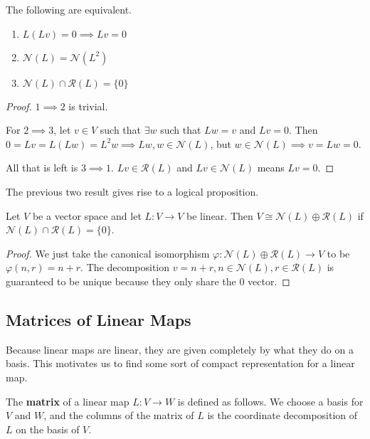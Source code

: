 \begin{prop}
The following are equivalent.
\begin{enumerate}
\item $L(Lv) = 0 \implies Lv = 0$
\item $\mathcal{N}(L) = \mathcal{N}(L^2)$
\item $\mathcal{N}(L) \cap \mathcal{R}(L) = \lbrace 0 \rbrace$
\end{enumerate}
\end{prop}

\begin{proof}
$1 \implies 2$ is trivial.

For $2 \implies 3$, let $v \in V$ such that $\exists w$ such that $Lw =
v$ and $Lv = 0$. Then $0 = Lv = L(Lw) = L^2 w \implies Lw, w \in
\mathcal{N}(L)$, but $w \in \mathcal{N}(L) \implies v = Lw = 0$.

All that is left is $3 \implies 1$. $Lv \in \mathcal{R}(L)$ and $Lv \in
\mathcal{N}(L)$ means $Lv = 0$.
\end{proof}

The previous two result gives rise to a logical proposition.
\begin{prop}
Let $V$ be a vector space and let $L : V \rightarrow V$ be linear. Then
$V \cong \mathcal{N}(L) \oplus \mathcal{R}(L)$ if $\mathcal{N}(L) \cap
\mathcal{R}(L) = \lbrace 0 \rbrace$.
\end{prop}

\begin{proof}
We just take the canonical isomorphism $\varphi : \mathcal{N}(L) \oplus
\mathcal{R}(L) \rightarrow V $ to be $\varphi(n, r) = n + r$. The
decomposition $v = n + r, n \in \mathcal{N}(L), r \in \mathcal{R}(L)$ is
guaranteed to be unique because they only share the 0 vector.
\end{proof}

\subsection{Matrices of Linear Maps}
Because linear maps are linear, they are given completely by what they
do on a basis. This motivates us to find some sort of compact
representation for a linear map.

\begin{df}
The \textbf{matrix} of a linear map $L : V \rightarrow W$ is defined as
follows. We choose a basis for $V$ and $W$, and the columns of the
matrix of $L$ is the coordinate decomposition of $L$ on the basis of
$V$.
\end{df}

